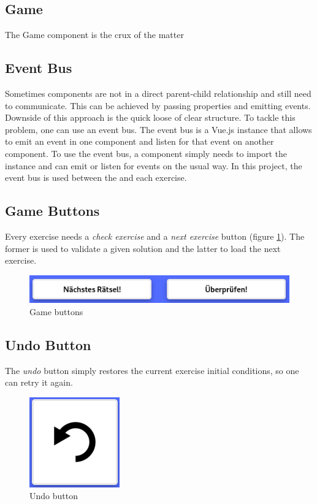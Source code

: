 \subsection*{Game}
The Game component is the crux of the matter

\subsection*{Event Bus}
Sometimes components are not in a direct parent-child relationship and still need to communicate. This can be achieved by passing properties and emitting events. Downside of this approach is the quick loose of clear structure. To tackle this problem, one can use an event bus. 
The event bus is a Vue.js instance that allows to emit an event in one component and listen for that event on another component. To use the event bus, a component simply needs to import the instance and can emit or listen for events on the usual way. In this project, the event bus is used between the  and each exercise.

\subsection*{Game Buttons}
\label{subsection:gameButtons}
Every exercise needs a \textit{check exercise} and a \textit{next exercise} button (figure \ref{fig:gameButtons}). The former is used to validate a given solution and the latter to load the next exercise.

\begin{figure}[h]
    \centering
    \includegraphics[width=0.5\columnwidth]{figures/game_buttons.png}
    \caption{Game buttons}
    \label{fig:gameButtons} 
\end{figure}

\subsection*{Undo Button}
The \textit{undo} button simply restores the current exercise initial conditions, so one can retry it again.

\begin{figure}[h]
    \centering
    \includegraphics[width=0.1\columnwidth]{figures/undo.png}
    \caption{Undo button}
    \label{fig:undo} 
\end{figure}

